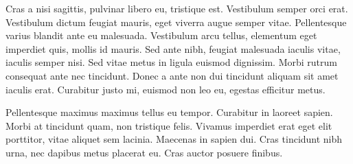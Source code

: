 
Cras a nisi sagittis, pulvinar libero eu, tristique est. Vestibulum semper orci erat. Vestibulum dictum feugiat mauris, eget viverra augue semper vitae. Pellentesque varius blandit ante eu malesuada. Vestibulum arcu tellus, elementum eget imperdiet quis, mollis id mauris. Sed ante nibh, feugiat malesuada iaculis vitae, iaculis semper nisi. Sed vitae metus in ligula euismod dignissim. Morbi rutrum consequat ante nec tincidunt. Donec a ante non dui tincidunt aliquam sit amet iaculis erat. Curabitur justo mi, euismod non leo eu, egestas efficitur metus.

Pellentesque maximus maximus tellus eu tempor. Curabitur in laoreet sapien. Morbi at tincidunt quam, non tristique felis. Vivamus imperdiet erat eget elit porttitor, vitae aliquet sem lacinia. Maecenas in sapien dui. Cras tincidunt nibh urna, nec dapibus metus placerat eu. Cras auctor posuere finibus. 